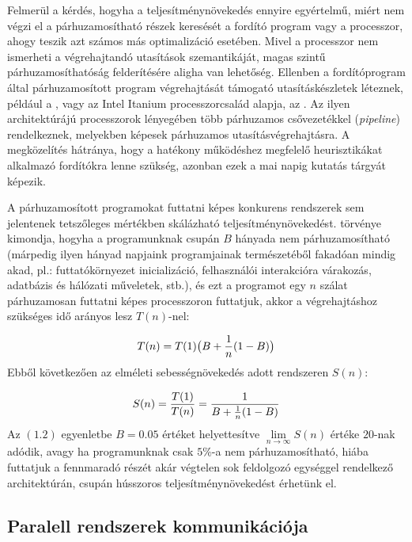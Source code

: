     Felmerül a kérdés, hogyha a teljesítménynövekedés ennyire egyértelmű, miért nem végzi el a párhuzamosítható részek keresését a fordító program vagy a processzor, ahogy teszik azt számos más optimalizáció esetében. Mivel a processzor nem ismerheti a végrehajtandó utasítások szemantikáját, magas szintű párhuzamosíthatóság felderítésére aligha van lehetőség. Ellenben a fordítóprogram által párhuzamosított program végrehajtását támogató utasításkészletek léteznek, például a \cite{VLIW}, vagy az Intel Itanium processzorcsalád alapja, az \cite{EPIC}. Az ilyen architektúrájú processzorok lényegében több párhuzamos csővezetékkel (\emph{pipeline}) rendelkeznek, melyekben képesek párhuzamos utasításvégrehajtásra. A megközelítés hátránya, hogy a hatékony működéshez megfelelő heurisztikákat alkalmazó fordítókra lenne szükség, azonban ezek a mai napig kutatás tárgyát képezik.
    
    A párhuzamosított programokat futtatni képes konkurens rendszerek sem jelentenek tetszőleges mértékben skálázható teljesítménynövekedést. \cite{Amdahl} törvénye kimondja, hogyha a programunknak csupán $B$ hányada nem párhuzamosítható (márpedig ilyen hányad napjaink programjainak természetéből fakadóan mindig akad, pl.: futtatókörnyezet inicializáció, felhasználói interakcióra várakozás, adatbázis és hálózati műveletek, stb.), és ezt a programot egy $n$ szálat párhuzamosan futtatni képes processzoron futtatjuk, akkor a végrehajtáshoz szükséges idő arányos lesz $T(n)$-nel:
    
    \begin{equation}
        T(n) = T(1)\big(B+\frac{1}{n}(1-B)\big)
    \medskip
    \end{equation}
%    
    Ebből következően az elméleti sebességnövekedés adott rendszeren $S(n)$:
    
    \begin{equation} \label{eq:amdahl}
        S(n) = \frac{T(1)}{T(n)} = \frac{1}{B+\frac{1}{n}(1-B)}
    \medskip
    \end{equation}
%
    Az $(1.2)$ egyenletbe $B = 0.05$ értéket helyettesítve $\lim\limits_{n \rightarrow \infty}{S(n)}$ értéke $20$-nak adódik, avagy ha programunknak csak $5\%$-a nem párhuzamosítható, hiába futtatjuk a fennmaradó részét akár végtelen sok feldolgozó egységgel rendelkező architektúrán, csupán hússzoros teljesítménynövekedést érhetünk el.

    \subsection{Paralell rendszerek kommunikációja} 
    \label{sec:communication_of_parallel_systems} 
        
